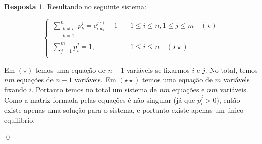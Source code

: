 \documentclass{amsart}
\theoremstyle{plain}
\theoremstyle{definition}
\newtheorem{answer}{Resposta}
\numberwithin{equation}{section}
\begin{document}
\begin{answer}
  Resultando no seguinte sistema:

  \begin{equation*}
    \begin{cases}
      \sum_{\substack{k\neq i\\k=1}}^n p_k^j = c_i^j\frac{s_j}{w_i}-1 & \quad 1\leq
      i\leq n, 1\leq j\leq m \quad (\star)\\
      \sum_{j=1}^m p_i^j = 1, & \quad 1\leq i\leq n \quad (\star\star)\\
    \end{cases}
  \end{equation*}

  Em $(\star)$ temos uma equação de $n-1$ variáveis se fixarmos $i$ e $j$. No total, temos $nm$
  equações de $n-1$ variáveis. Em $(\star\star)$ temos uma equação de $m$ variávels fixando $i$.
  Portanto temos no total um sistema de $nm$ equações e $nm$ variáveis. Como a matriz formada pelas
  equações é não-singular (já que $p_i^j>0$), então existe apenas uma solução para o sistema, e
  portanto existe apenas um único equilibrio.

  \hfill\qed%
\end{answer}

\printbibliography[]
\end{document}
